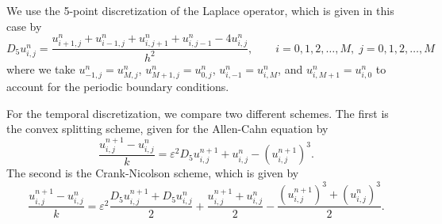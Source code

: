 \documentclass{article}
\begin{document}
	We use the 5-point discretization of the Laplace operator, which is given in this case by
	\begin{equation}
		D_5u^n_{i,j} = \frac{u^n_{i+1,j} + u^n_{i-1,j} + u^n_{i,j+1} + u^n_{i,j-1} - 4u^n_{i,j}}{h^2},\qquad i=0,1,2,\dots,M,\;j=0,1,2,\dots, M
	\end{equation}
	where we take $u^n_{-1,j} = u^n_{M,j}$, $u^n_{M+1,j} = u^n_{0,j}$, $u^n_{i,-1} = u^n_{i,M}$, and $u^n_{i,M+1} = u^n_{i,0}$ to account for the periodic boundary conditions.
	
	For the temporal discretization, we compare two different schemes. The first is the convex splitting scheme, given for the Allen-Cahn equation by
	\begin{equation}
		\frac{u^{n+1}_{i,j} - u^n_{i,j}}{k} = \varepsilon^2D_5u^{n+1}_{i,j} + u^n_{i,j} - \left(u^{n+1}_{i,j}\right)^3.
	\end{equation}
	The second is the Crank-Nicolson scheme, which is given by
	\begin{equation}
		\frac{u^{n+1}_{i,j} - u^n_{i,j}}{k} = \varepsilon^2\frac{D_5u^{n+1}_{i,j} + D_5u^n_{i,j}}{2} + \frac{u^{n+1}_{i,j} + u^n_{i,j}}{2} - \frac{\left(u^{n+1}_{i,j}\right)^3 + \left(u^n_{i,j}\right)^3}{2}.
	\end{equation}
	
\end{document}
